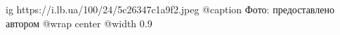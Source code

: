  
 
 
 
 

\ifcmt
  ig https://i.lb.ua/100/24/5c26347c1a9f2.jpeg
	@caption Фото: предоставлено автором
  @wrap center
  @width 0.9
\fi
